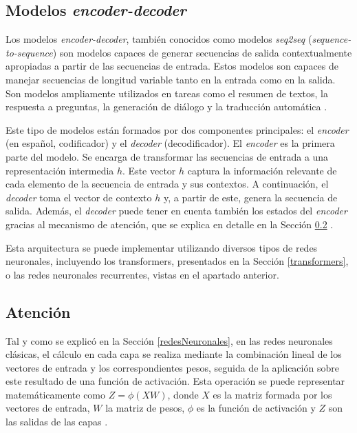 \documentclass[11pt,spanish,listoffigures,listoftables]{tfgetsinf}
\begin{document}
\subsection{Modelos \textit{encoder-decoder}} \label{encdec}

Los modelos \textit{encoder-decoder}, también conocidos como modelos \textit{seq2seq} (\textit{sequence-to-sequence}) son modelos capaces de generar secuencias de salida contextualmente apropiadas a partir de las secuencias de entrada. Estos modelos son capaces de manejar secuencias de longitud variable tanto en la entrada como en la salida. Son modelos ampliamente utilizados en tareas como el resumen de textos, la respuesta a preguntas, la generación de diálogo y la traducción automática \cite{jurafsky2023speech}.

Este tipo de modelos están formados por dos componentes principales: el \textit{encoder} (en español, codificador) y el \textit{decoder} (decodificador). El \textit{encoder} es la primera parte del modelo. Se encarga de transformar las secuencias de entrada a una representación intermedia $h$. Este vector $h$ captura la información relevante de cada elemento de la secuencia de entrada y sus contextos. A continuación, el \textit{decoder} toma el vector de contexto $h$ y, a partir de este, genera la secuencia de salida. Además, el \textit{decoder} puede tener en cuenta también los estados del \textit{encoder} gracias al mecanismo de atención, que se explica en detalle en la Sección \ref{atencion} \cite{sriram2017coldfusiontrainingseq2seq}.

Esta arquitectura se puede implementar utilizando diversos tipos de redes neuronales, incluyendo los transformers, presentados en la Sección \ref{transformers}, o las redes neuronales recurrentes, vistas en el apartado anterior.

\subsection{Atención} \label{atencion}

Tal y como se explicó en la Sección \ref{redesNeuronales}, en las redes neuronales clásicas, el cálculo en cada capa se realiza mediante la combinación lineal de los vectores de entrada y los correspondientes pesos, seguida de la aplicación sobre este resultado de una función de activación. Esta operación se puede representar matemáticamente como $Z = \phi(XW)$, donde $X$ es la matriz formada por los vectores de entrada, $W$ la matriz de pesos, $\phi$ es la función de activación y $Z$ son las salidas de las capas \cite{murphy2022probabilistic}. 
\end{document}
